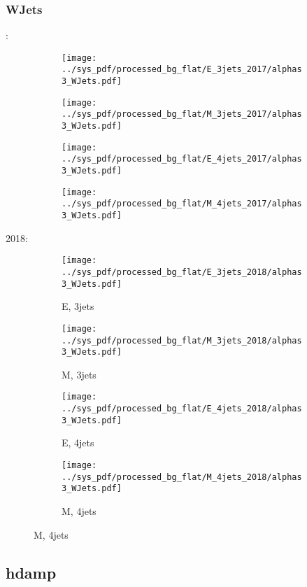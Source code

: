 \documentclass{beamer}
\begin{document}
\begin{frame}
\frametitle{WJets}
\fontsize{5}{1}:
\begin{figure}
\centering
\begin{subfigure}[b]{0.24\textwidth}
\texttt{[image: ../sys\_pdf/processed\_bg\_flat/E\_3jets\_2017/alphas3\_WJets.pdf]}
\end{subfigure}
\begin{subfigure}[b]{0.24\textwidth}
\texttt{[image: ../sys\_pdf/processed\_bg\_flat/M\_3jets\_2017/alphas3\_WJets.pdf]}
\end{subfigure}
\begin{subfigure}[b]{0.24\textwidth}
\texttt{[image: ../sys\_pdf/processed\_bg\_flat/E\_4jets\_2017/alphas3\_WJets.pdf]}
\end{subfigure}
\begin{subfigure}[b]{0.24\textwidth}
\texttt{[image: ../sys\_pdf/processed\_bg\_flat/M\_4jets\_2017/alphas3\_WJets.pdf]}
\end{subfigure}
\end{figure}
2018:
\begin{figure}
\centering
\begin{subfigure}[b]{0.24\textwidth}
\texttt{[image: ../sys\_pdf/processed\_bg\_flat/E\_3jets\_2018/alphas3\_WJets.pdf]}
\captionsetup{font=tiny}
\caption{E, 3jets}
\end{subfigure}
\begin{subfigure}[b]{0.24\textwidth}
\texttt{[image: ../sys\_pdf/processed\_bg\_flat/M\_3jets\_2018/alphas3\_WJets.pdf]}
\captionsetup{font=tiny}
\caption{M, 3jets}
\end{subfigure}
\begin{subfigure}[b]{0.24\textwidth}
\texttt{[image: ../sys\_pdf/processed\_bg\_flat/E\_4jets\_2018/alphas3\_WJets.pdf]}
\captionsetup{font=tiny}
\caption{E, 4jets}
\end{subfigure}
\begin{subfigure}[b]{0.24\textwidth}
\texttt{[image: ../sys\_pdf/processed\_bg\_flat/M\_4jets\_2018/alphas3\_WJets.pdf]}
\captionsetup{font=tiny}
\caption{M, 4jets}
\end{subfigure}
\end{figure}
\end{frame}


\subsection{hdamp}
\end{document}
